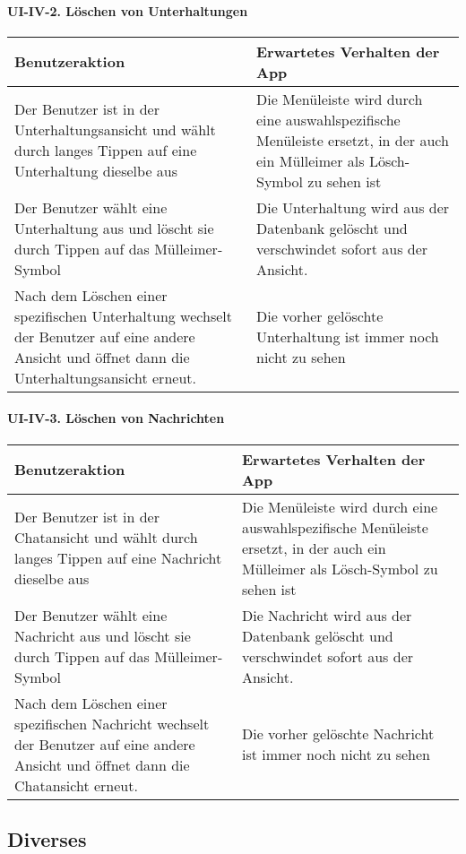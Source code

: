 \paragraph{UI-IV-2. Löschen von
Unterhaltungen}\label{luxf6schen-von-unterhaltungen}

\begin{longtable}{|p{8cm}|p{8.5cm}|}
\hline
Benutzeraktion & Erwartetes Verhalten der App\tabularnewline
\hline

Der Benutzer ist in der Unterhaltungsansicht und wählt durch langes
Tippen auf eine Unterhaltung dieselbe aus & Die Menüleiste wird durch
eine auswahlspezifische Menüleiste ersetzt, in der auch ein Mülleimer
als Lösch-Symbol zu sehen ist\tabularnewline
Der Benutzer wählt eine Unterhaltung aus und löscht sie durch Tippen auf
das Mülleimer-Symbol & Die Unterhaltung wird aus der Datenbank gelöscht
und verschwindet sofort aus der Ansicht.\tabularnewline
Nach dem Löschen einer spezifischen Unterhaltung wechselt der Benutzer
auf eine andere Ansicht und öffnet dann die Unterhaltungsansicht erneut.
& Die vorher gelöschte Unterhaltung ist immer noch nicht zu
sehen\tabularnewline
\hline
\end{longtable}

\paragraph{UI-IV-3. Löschen von
Nachrichten}\label{luxf6schen-von-nachrichten}

\begin{longtable}{|p{8cm}|p{8.5cm}|}
\hline
Benutzeraktion & Erwartetes Verhalten der App\tabularnewline
\hline

Der Benutzer ist in der Chatansicht und wählt durch langes Tippen auf
eine Nachricht dieselbe aus & Die Menüleiste wird durch eine
auswahlspezifische Menüleiste ersetzt, in der auch ein Mülleimer als
Lösch-Symbol zu sehen ist\tabularnewline
Der Benutzer wählt eine Nachricht aus und löscht sie durch Tippen auf
das Mülleimer-Symbol & Die Nachricht wird aus der Datenbank gelöscht und
verschwindet sofort aus der Ansicht.\tabularnewline
Nach dem Löschen einer spezifischen Nachricht wechselt der Benutzer auf
eine andere Ansicht und öffnet dann die Chatansicht erneut. & Die vorher
gelöschte Nachricht ist immer noch nicht zu sehen\tabularnewline
\hline
\end{longtable}

\clearpage
\subsection{ Diverses}\label{v-diverses}

